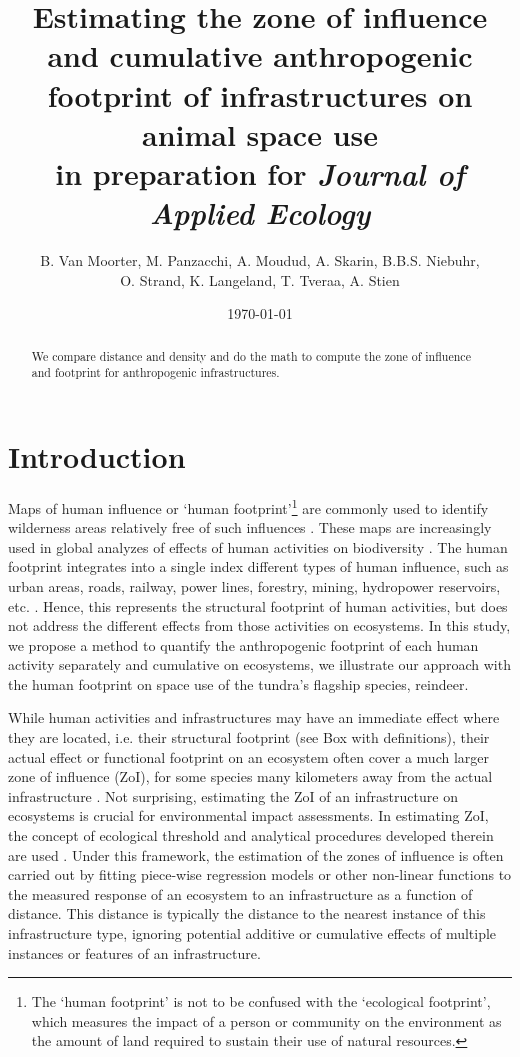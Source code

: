 \documentclass{article}
\title{Estimating the zone of influence and cumulative anthropogenic footprint of infrastructures on animal space use \\
{\normalsize in preparation for \textit{Journal of Applied Ecology}}}
\author{B. Van Moorter, M. Panzacchi, A. Moudud, A. Skarin, B.B.S. Niebuhr, \\ O. Strand, K. Langeland, T. Tveraa, A. Stien}
\date{\today}
\begin{document}
\maketitle

\begin{abstract}
We compare distance and density and do the math to compute the zone of influence and footprint for anthropogenic infrastructures. 
\end{abstract}


\section{Introduction}

Maps of human influence or `human footprint'\footnote{The `human footprint' is not to be confused with the `ecological footprint', which measures the impact of a person or community on the environment as the amount of land required to sustain their use of natural resources.} are commonly used to identify wilderness areas relatively free of such influences \citep{sanderson2002human,allan2017temporally}. These maps are increasingly used in global analyzes of effects of human activities on biodiversity \citep{tucker2018moving,williams2020change}. The human footprint integrates into a single index different types of human influence, such as urban areas, roads, railway, power lines, forestry, mining, hydropower reservoirs, etc. \citep{woolmer2008rescaling}. Hence, this represents the structural footprint of human activities, but does not address the different effects from those activities on ecosystems. In this study, we propose a method to quantify the anthropogenic footprint of each human activity separately and cumulative on ecosystems, we illustrate our approach with the human footprint on space use of the tundra's flagship species, reindeer.  

While human activities and infrastructures may have an immediate effect where they are located, i.e. their structural footprint (see Box with definitions), their actual effect or functional footprint on an ecosystem often cover a much larger zone of influence (ZoI), for some species many kilometers away from the actual infrastructure \citep{torres2016assessing}. Not surprising, estimating the ZoI of an infrastructure on ecosystems is crucial for environmental impact assessments. In estimating ZoI, the concept of ecological threshold \citep{holling1973resilience} and analytical procedures developed therein \citep{ficetola2009ecological} are used \citep{boulanger2012estimating}. Under this framework, the estimation of the zones of influence is often carried out by fitting piece-wise regression models \citep{ficetola2009ecological} or other non-linear functions \citep[such as an exponential decay;][]{skarin2018out} to the measured response of an ecosystem to an infrastructure as a function of distance. This distance is typically the distance to the nearest instance of this infrastructure type, ignoring potential additive or cumulative effects of multiple instances or features of an infrastructure.   
\end{document}
